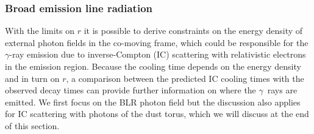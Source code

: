 \documentclass[twocolumn,linenumbers]{aastex62}
\newcommand{\Grays}{$\gamma$~rays\xspace}
\newcommand{\gray}{$\gamma$-ray\xspace}
\begin{document}
\subsubsection{Broad emission line radiation}
With the limits on $r$ it is possible to derive constraints on the energy density of external photon fields in the co-moving frame, which could be responsible for the \gray emission due to inverse-Compton (IC) scattering with relativistic electrons in the emission region. 
Because the cooling time depends on the energy density and in turn on $r$, a comparison between the predicted IC cooling times with the observed decay times can provide further information on where the \Grays are emitted.
We first focus on the BLR photon field but the discussion also applies for IC scattering with photons of the dust torus, which we will discuss at the end of this section.
\end{document}
